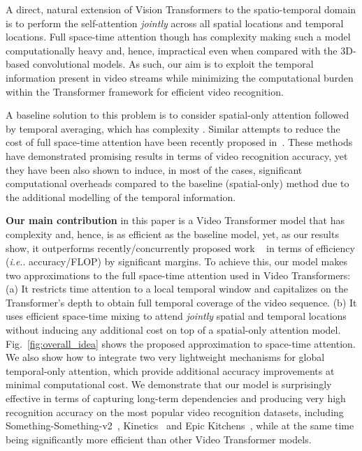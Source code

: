\documentclass{article}
\makeatletter
\DeclareRobustCommand\onedot{\futurelet\@let@token\@onedot}
\def\@onedot{\ifx\@let@token.\else.\null\fi\xspace}
\def\ie{\emph{i.e}\onedot} \def\Ie{\emph{I.e}\onedot}
\makeatother
\begin{document}
A direct, natural extension of Vision Transformers to the spatio-temporal domain is to perform the self-attention \textit{jointly} across all  spatial locations and  temporal locations. Full space-time attention though has complexity  making such a model computationally heavy and, hence, impractical even when compared with the 3D-based convolutional models. As such, our aim is to exploit the temporal information present in video streams while minimizing the computational burden within the Transformer framework for efficient video recognition. 

A baseline solution to this problem is to consider spatial-only attention followed by temporal averaging, which has complexity . Similar attempts to reduce the cost of full space-time attention have been recently proposed in~\citep{bertasius2021space,arnab2021vivit}. These methods have demonstrated promising results in terms of video recognition accuracy, yet they have been also shown to induce, in most of the cases, significant computational overheads compared to the baseline (spatial-only) method due to the additional modelling of the temporal information. 

\textbf{Our main contribution} in this paper is a Video Transformer model that has complexity  and, hence, is as efficient as the baseline model, yet, as our results show, it outperforms  recently/concurrently proposed work ~\citep{bertasius2021space,arnab2021vivit} in terms of efficiency (\ie accuracy/FLOP) by significant margins. To achieve this, our model makes two approximations to the full space-time attention used in Video Transformers: (a) It restricts time attention to a local temporal window and capitalizes on the Transformer's depth to obtain full temporal coverage of the video sequence. (b) It uses efficient space-time mixing to attend \textit{jointly} spatial and temporal locations without inducing any additional cost on top of a spatial-only attention model. Fig.~\ref{fig:overall_idea} shows the proposed approximation to space-time attention. We also show how to integrate two very lightweight mechanisms for global temporal-only attention, which provide additional accuracy improvements at minimal computational cost. We demonstrate that our model is surprisingly effective in terms of capturing long-term dependencies and producing very high recognition accuracy on the most popular video recognition datasets, including Something-Something-v2~\citep{goyal2017something}, Kinetics~\citep{carreira2017quo} and Epic Kitchens~\citep{damen2018scaling}, while at the same time being significantly more efficient than other Video Transformer models.
\end{document}
